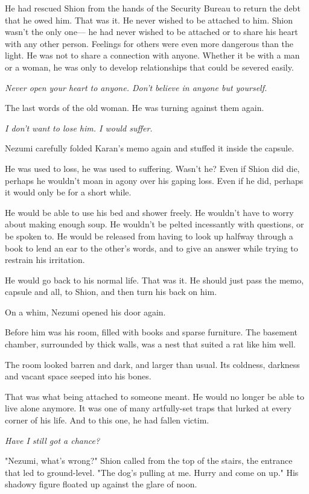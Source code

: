 He had rescued Shion from the hands of the Security Bureau to return the
debt that he owed him. That was it. He never wished to be attached to
him. Shion wasn't the only one--- he had never wished to be attached or to
share his heart with any other person. Feelings for others were even
more dangerous than the light. He was not to share a connection with
anyone. Whether it be with a man or a woman, he was only to develop
relationships that could be severed easily.

\emph{Never open your heart to anyone. Don't believe in anyone but yourself.}

The last words of the old woman. He was turning against them again.

\emph{I don't want to lose him. I would suffer.}

Nezumi carefully folded Karan's memo again and stuffed it inside the
capsule.

He was used to loss, he was used to suffering. Wasn't he? Even if Shion
did die, perhaps he wouldn't moan in agony over his gaping loss. Even if
he did, perhaps it would only be for a short while.

He would be able to use his bed and shower freely. He wouldn't have to
worry about making enough soup. He wouldn't be pelted incessantly with
questions, or be spoken to. He would be released from having to look up
halfway through a book to lend an ear to the other's words, and to give
an answer while trying to restrain his irritation.

He would go back to his normal life. That was it. He should just pass
the memo, capsule and all, to Shion, and then turn his back on him.

On a whim, Nezumi opened his door again.

Before him was his room, filled with books and sparse furniture. The
basement chamber, surrounded by thick walls, was a nest that suited a
rat like him well.

The room looked barren and dark, and larger than usual. Its coldness,
darkness and vacant space seeped into his bones.

That was what being attached to someone meant. He would no longer be
able to live alone anymore. It was one of many artfully-set traps that
lurked at every corner of his life. And to this one, he had fallen
victim.

\emph{Have I still got a chance?}

"Nezumi, what's wrong?" Shion called from the top of the stairs, the
entrance that led to ground-level. "The dog's pulling at me. Hurry and
come on up." His shadowy figure floated up against the glare of noon.

